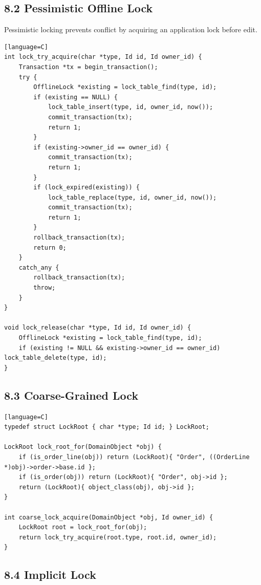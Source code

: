 \documentclass[11pt]{article}
\begin{document}
\subsection{8.2 Pessimistic Offline
Lock}\label{pessimistic-offline-lock}

Pessimistic locking prevents conflict by acquiring an application lock
before edit.

\begin{verbatim}[language=C]
int lock_try_acquire(char *type, Id id, Id owner_id) {
    Transaction *tx = begin_transaction();
    try {
        OfflineLock *existing = lock_table_find(type, id);
        if (existing == NULL) {
            lock_table_insert(type, id, owner_id, now());
            commit_transaction(tx);
            return 1;
        }
        if (existing->owner_id == owner_id) {
            commit_transaction(tx);
            return 1;
        }
        if (lock_expired(existing)) {
            lock_table_replace(type, id, owner_id, now());
            commit_transaction(tx);
            return 1;
        }
        rollback_transaction(tx);
        return 0;
    }
    catch_any {
        rollback_transaction(tx);
        throw;
    }
}

void lock_release(char *type, Id id, Id owner_id) {
    OfflineLock *existing = lock_table_find(type, id);
    if (existing != NULL && existing->owner_id == owner_id) lock_table_delete(type, id);
}
\end{verbatim}

\subsection{8.3 Coarse-Grained Lock}\label{coarse-grained-lock}

\begin{verbatim}[language=C]
typedef struct LockRoot { char *type; Id id; } LockRoot;

LockRoot lock_root_for(DomainObject *obj) {
    if (is_order_line(obj)) return (LockRoot){ "Order", ((OrderLine *)obj)->order->base.id };
    if (is_order(obj)) return (LockRoot){ "Order", obj->id };
    return (LockRoot){ object_class(obj), obj->id };
}

int coarse_lock_acquire(DomainObject *obj, Id owner_id) {
    LockRoot root = lock_root_for(obj);
    return lock_try_acquire(root.type, root.id, owner_id);
}
\end{verbatim}

\subsection{8.4 Implicit Lock}\label{implicit-lock}
\end{document}
